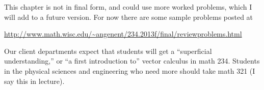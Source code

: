 \documentclass[11pt]{amsbook}
\begin{document}
This chapter is not in final form, and could use more worked problems, which I will add
to a future version.  For now there are some sample problems posted at  
\begin{center}
  \footnotesize
  \url{http://www.math.wisc.edu/~angenent/234.2013f/final/reviewproblems.html}
\end{center}

Our client departments expect that students will get a ``superficial understanding,''
or ``a first introduction to'' vector calculus in math 234.  Students in the physical
sciences and engineering who need more should take math 321 (I say this in lecture).
\end{document}
